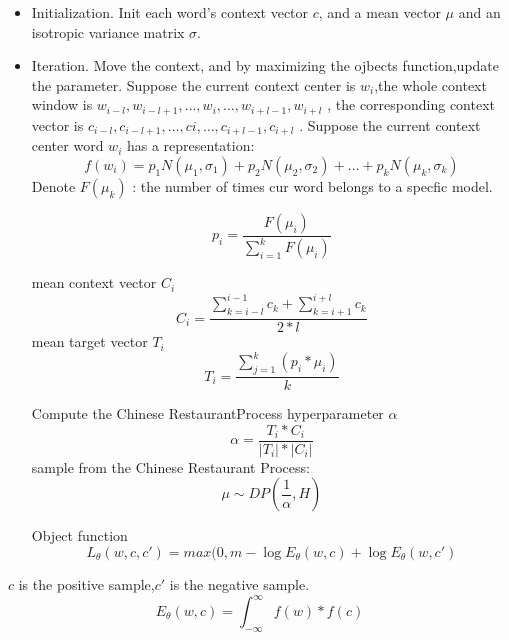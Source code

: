 \documentclass{article}
\begin{document}
\begin{itemize}
\item Initialization.
Init each word's context vector $c$, and a mean vector $\mu$ and an isotropic  
variance matrix $\sigma$.\newline
\item Iteration.
Move the context, and by maximizing the ojbects function,update the parameter.\newline
Suppose the current context center is $w_i$,the whole context window is 
$w_{i-l},w_{i-l+1},\ldots,w_{i},\ldots,w_{i+l-1},w_{i+l}$ , the corresponding context vector is $c_{i-l},c_{i-l+1},\ldots,c{i},\ldots,c_{i+l-1},c_{i+l}$ . \newline
Suppose the current context center word $w_i$ has a representation:
	\begin{equation}
	 f(w_i) = p_1N(\mu_1,\sigma_1) + p_2N(\mu_2,\sigma_2) + \ldots+ p_kN(\mu_k,\sigma_k)
	\end{equation}
Denote $F(\mu_k)$ : the number of times cur word belongs to a specfic model.
 
	\begin{equation}
	 	p_i = \frac{F(\mu_i)}{\sum_{i=1}^{k}F(\mu_i)}
	\end{equation}

mean context vector $C_{i}$
	\begin{equation}
		C_{i} = \frac{\sum_{k=i-l}^{i-1}{c_k} + \sum_{k = i+1}^{i+l}{c_k}}{2*l}
	\end{equation}
mean target vector $T_{i}$
	\begin{equation}
		T_{i} = \frac{\sum_{j=1}^{k}{(p_i*\mu_i)}}{k}
	\end{equation}

Compute the Chinese RestaurantProcess hyperparameter $\alpha$
	\begin{equation}
	 	\alpha = \frac{T_{i}*C_{i}}{|T_i|*|C_i|}
	\end{equation}
sample from the Chinese Restaurant Process:
	\begin{equation}
		\mu \sim DP(\frac{1}{\alpha},H)
	\end{equation}

Object function
	\begin{equation}
		L_\theta(w,c,c') = max(0,m - \log{E_\theta(w,c)} + \log{E_\theta(w,c')}
	\end{equation}
\end{itemize}
$c$ is the positive sample,$c'$ is the negative sample.
	\begin{equation}
		E_\theta(w,c) = \int_{-\infty}^{\infty}{f(w)*f(c)}
	\end{equation}
\end{document}
